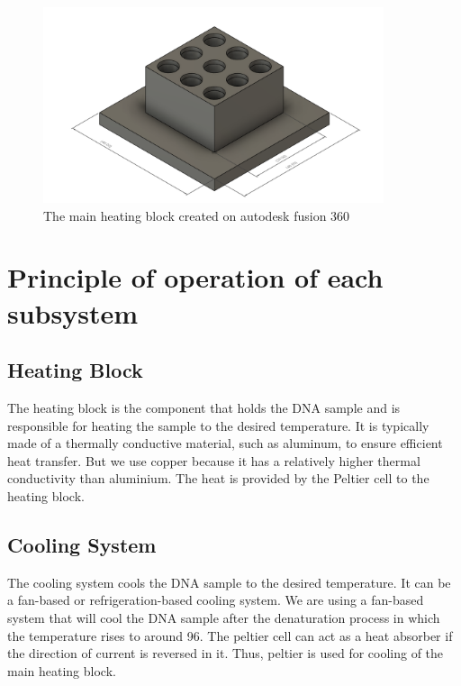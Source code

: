 \documentclass{article}
\begin{document}
\begin{figure}[htp]
    \centering
    \includegraphics[width=10cm]{Images/Mainheatingblock.png}
    \caption{The main heating block created on autodesk fusion 360}
    \label{fig:galaxy}
\end{figure}




\maketitle

\section{Principle of operation of each subsystem}
\subsection{Heating Block}
The heating block is the component that holds the DNA sample and is responsible for heating the sample to the desired temperature. It is typically made of a thermally conductive material, such as aluminum, to ensure efficient heat transfer. But we use copper because it has a relatively higher thermal conductivity than aluminium. The heat is provided by the Peltier cell to the heating block.


\subsection{Cooling System}
The cooling system cools the DNA sample to the desired temperature. It can be a fan-based or refrigeration-based cooling system. We are using a fan-based system that will cool the DNA sample after the denaturation process in which the temperature rises to around 96. The peltier cell can act as a heat absorber if the direction of current is reversed in it. Thus, peltier is used for cooling of the main heating block.
\end{document}
